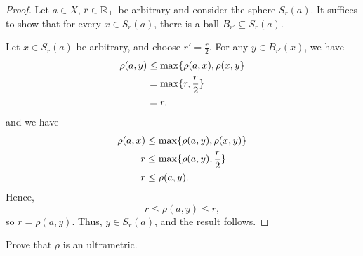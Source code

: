 \begin{proof}
    Let $a \in X$, $r \in \mathbb{R}_+$ be arbitrary and consider the sphere $S_r(a)$.
    It suffices to show that for every $x \in S_r(a)$, there is a ball $B_{r'}
    \subseteq S_r(a)$. 

    Let $x \in S_r(a)$ be arbitrary, and choose $r' = \frac{r}{2}$. For any $y
    \in B_{r'}(x)$, we have
    \begin{align*}
        \rho(a, y) &\leq \max \{\rho(a, x), \rho(x, y\} \\
        &= \max \{r, \frac{r}{2}\} \\
        &= r,
    \end{align*}
    and we have
    \begin{align*}
        \rho(a, x) &\leq \max \{\rho(a, y), \rho(x, y)\} \\
        r &\leq \max \{\rho(a, y), \frac{r}{2}\} \\
        r &\leq \rho(a, y).
    \end{align*}
    Hence,
    \[
        r \leq \rho(a, y) \leq r,
    \]
    so $r = \rho(a, y)$. Thus, $y \in S_{r}(a)$, and the result follows.
\end{proof}


\begin{majorEx}
    Prove that $\rho$ is an ultrametric.
\end{majorEx}

